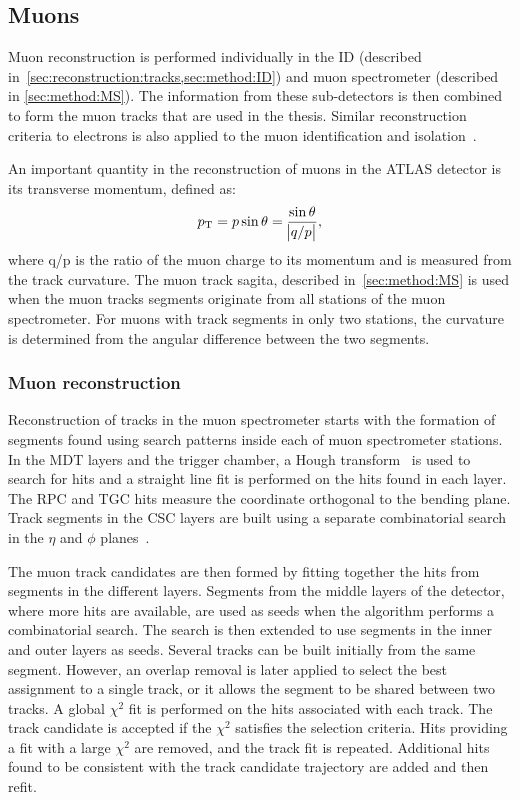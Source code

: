 \subsection{Muons}\label{sec:reconstruction:muons}
Muon reconstruction is performed individually in the ID (described in~\cref{sec:reconstruction:tracks,sec:method:ID}) and muon spectrometer (described in \cref{sec:method:MS}). The information from these sub-detectors is then combined to form the muon tracks that are used in the thesis. Similar reconstruction criteria to electrons is also applied to the muon identification and isolation~\cite{Aad:2016jkr}. 

An important quantity in the reconstruction of muons in the ATLAS detector is its transverse momentum, defined as: 
\begin{equation}
    p_{\text{T}} = p\sin\theta = \frac{\sin\theta}{\abs{q/p}},
\end{equation}
where q/p is the ratio of the muon charge to its momentum and is measured from the track curvature. The muon track sagita, described in~\cref{sec:method:MS} is used when the muon tracks segments originate from all stations of the muon spectrometer. For muons with track segments in only two stations, the curvature is determined from the angular difference between the two segments. 

\subsubsection{Muon reconstruction}
Reconstruction of tracks in the muon spectrometer starts with the formation of segments found using search patterns inside each of muon spectrometer stations. In the MDT layers and the trigger chamber, a Hough transform~\cite{HoughTransform} is used to search for hits and a straight line fit is performed on the hits found in each layer. The RPC and TGC hits measure the coordinate orthogonal to the bending plane. Track segments in the CSC layers are built using a separate combinatorial search in the $\eta$ and $\phi$ planes~\cite{Aad:2016jkr}. 

The muon track candidates are then formed by fitting together the hits from segments in the different layers. Segments from the middle layers of the detector, where more hits are available, are used as seeds when the algorithm performs a combinatorial search. The search is then extended to use segments in the inner and outer layers as seeds. Several tracks can be built initially from the same segment. However, an overlap removal is later applied to select the best assignment to a single track, or it allows the segment to be shared between two tracks. A global $\chi^2$ fit is performed on the hits associated with each track. The track candidate is accepted if the $\chi^2$ satisfies the selection criteria. Hits providing a fit with a large $\chi^2$ are removed, and the track fit is repeated. Additional hits found to be consistent with the track candidate trajectory are added and then refit. 

